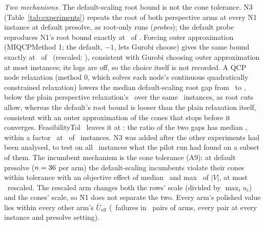 \documentclass[conference]{IEEEtran}
\newcommand{\Ub}{\bar U}
\begin{document}
\emph{Two mechanisms.} The default-scaling root bound is not the cone tolerance. N3 (Table~\ref{tab:experiments}) repeats the root of both perspective arms at every N1 instance at default presolve, as root-only runs (\emph{probes}); the default probe reproduces N1's root bound exactly at \NThreeReproDef\ of \NThreeN. Forcing outer approximation (MIQCPMethod 1; the default, $-1$, lets Gurobi choose) gives the same bound exactly at \NThreeEOneDef\ of \NThreeN\ (rescaled: \NThreeEOneResc), consistent with Gurobi choosing outer approximation at most instances; its logs are off, so the choice itself is not recorded. A QCP node relaxation (method 0, which solves each node's continuous quadratically constrained relaxation) lowers the median default-scaling root gap from \NThreeGapDef\ to \NThreeGapMZero, below the plain perspective relaxation's \NThreeGapPlain\ over the same \NThreeN\ instances, as root cuts allow, whereas the default's root bound is looser than the plain relaxation itself, consistent with an outer approximation of the cones that stops before it converges. FeasibilityTol \NThreeFeasTol\ leaves it at \NThreeGapFeas: the ratio of the two gaps has median \NThreeRatioMed, within a factor \NThreeBandHi\ at \NThreeRatioIn\ of \NThreeN\ instances. N3 was added after the other experiments had been analysed, to test on all \NThreeN\ instances what the pilot run had found on a subset of them. The incumbent mechanism is the cone tolerance (A9): at default presolve ($n=36$ per arm) the default-scaling incumbents violate their cones within tolerance with an objective effect of median \ConeDefMed\ and max \ConeDefMax\ of $|V|$, at most \ConeRescMax\ rescaled. The rescaled arm changes both the rows' scale (divided by $\max_iu_i$) and the cones' scale, so N1 does not separate the two. Every arm's polished value lies within every other arm's $\Ub_{\mathrm{eff}}$ (\KTwentyTwoFail\ failures in \KTwentyTwoPairs\ pairs of arms, every pair at every instance and presolve setting).
\end{document}
